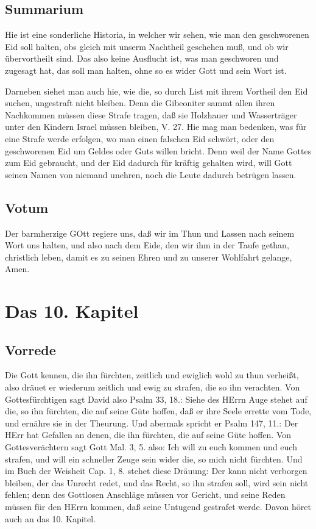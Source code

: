 \section{Summarium}

Hie ist eine sonderliche Historia, in welcher wir sehen, wie man den geschworenen Eid soll halten, obs gleich mit unserm Nachtheil geschehen muß, und ob wir übervortheilt sind. Das also keine Ausflucht ist, was man geschworen und zugesagt hat, das soll man halten, ohne so es wider Gott und sein Wort ist.

Darneben siehet man auch hie, wie die, so durch List mit ihrem Vortheil den Eid suchen, ungestraft nicht bleiben. Denn die Gibeoniter sammt allen ihren Nachkommen müssen diese Strafe tragen, daß sie Holzhauer und Wasserträger unter den Kindern Israel müssen bleiben, V. 27. Hie mag man bedenken, was für eine Strafe werde erfolgen, wo man einen falschen Eid schwört, oder den geschworenen Eid um Geldes oder Guts willen bricht. Denn weil der Name Gottes zum Eid gebraucht, und der Eid dadurch für kräftig gehalten wird, will Gott seinen Namen von niemand unehren, noch die Leute dadurch betrügen lassen.

\section{Votum}

Der barmherzige GOtt regiere uns, daß wir im Thun und Lassen nach seinem Wort uns halten, und also nach dem Eide, den wir ihm in der Taufe gethan, christlich leben, damit es zu seinen Ehren und zu unserer Wohlfahrt gelange, Amen.

\chapter{Das 10. Kapitel}

\section{Vorrede}

Die Gott kennen, die ihn fürchten, zeitlich und ewiglich wohl zu thun verheißt, also dräuet er wiederum zeitlich und ewig zu strafen, die so ihn verachten. Von Gottesfürchtigen sagt David also Psalm 33, 18.: Siehe des HErrn Auge stehet auf die, so ihn fürchten, die auf seine Güte hoffen, daß er ihre Seele errette vom Tode, und ernähre sie in der Theurung. Und abermals spricht er Psalm 147, 11.: Der HErr hat Gefallen an denen, die ihn fürchten, die auf seine Güte hoffen. Von Gottesverächtern sagt Gott Mal. 3, 5. also: Ich will zu euch kommen und euch strafen, und will ein schneller Zeuge sein wider die, so mich nicht fürchten. Und im Buch der Weisheit Cap. 1, 8. stehet diese Dräuung: Der kann nicht verborgen bleiben, der das Unrecht redet, und das Recht, so ihn strafen soll, wird sein nicht fehlen; denn des Gottlosen Anschläge müssen vor Gericht, und seine Reden müssen für den HErrn kommen, daß seine Untugend gestrafet werde. Davon höret auch an das 10. Kapitel.


